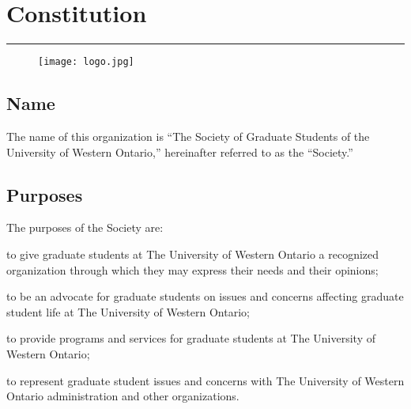 \chapter{Constitution}
\rule{\textwidth}{0.5pt}\vspace*{--\baselineskip}\vspace{3.2pt} %
\vfill


\begin{figure}
\centering
\texttt{[image: logo.jpg]}\\[1cm]
\end{figure}




\newpage


\section{Name}

The name of this organization is ``The Society of Graduate Students of the University of Western Ontario,'' hereinafter referred to as the ``Society.''  
 \newpage

\section{Purposes}

The purposes of the Society are:

	\begin{longenum}[ label*=\thesection.\arabic*., align=left]

 \item to give graduate students at The University of Western Ontario a recognized organization through which they may express their needs and their opinions;

 \item to be an advocate for graduate students on issues and concerns affecting graduate student life at The University of Western Ontario; 

 \item to provide programs and services for graduate students at The University of Western Ontario; 

 \item to represent graduate student issues and concerns with The University of Western Ontario administration and other organizations.
   \end{longenum}

